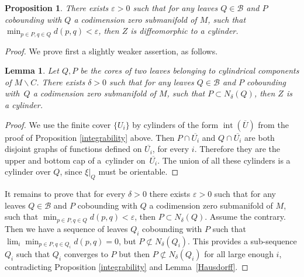\documentclass[JEP,XML,SOM,Unicode]{cedram}
\let\mathcal\mathscr
\let\moins\smallsetminus
\DeclareMathOperator{\inte}{int}
\newtheorem{lemma}[theorem]{Lemma}
\newtheorem{proposition}[theorem]{Proposition}
\theoremstyle{definition}
\theoremstyle{remark}
\numberwithin{equation}{section}
\begin{document}
\begin{proposition}\label{cylinderneighb}
There exists $\varepsilon\!>\!0$ such that for any leaves $Q\!\in\!\mathcal B$ and $P$ cobounding with $Q$ a codimension zero
submanifold of $M$, such that $\min_{p\in P, q\in Q} d(p,q) < \varepsilon$, then $Z$ is diffeomorphic to a cylinder.
\end{proposition}
\begin{proof}
We prove first a slightly weaker assertion, as follows.

\begin{lemma}
Let $Q,P$ be the cores of two leaves belonging to cylindrical components of $M\moins C$.
There exists $\delta>0$ such that for any leaves $Q\in \mathcal B$ and $P$ cobounding with~$Q$ a codimension zero
submanifold of $M$, such that $P\subset N_{\delta}(Q)$, then $Z$ is a cylinder.
\end{lemma}
\begin{proof}
We use the finite cover $\{U_i\}$ by cylinders of the form $\inte (\overline{U})$ from the proof of
Proposition \ref{integrability} above.
Then $P\cap \overline{U_i}$ and $Q\cap \overline{U_i}$ are both disjoint graphs of functions
defined on $\overline{U_i}$, for every $i$.
Therefore they are the upper and bottom cap of a~cylinder on~$\overline{U_i}$. The union of all these cylinders
is a cylinder over $Q$, since $\xi|_Q$ must be orientable.
\end{proof}

It remains to prove that for every $\delta>0$ there exists $\varepsilon>0$ such that for any leaves $Q\in \mathcal B$ and $P$ cobounding with $Q$ a codimension zero
submanifold of $M$, such that $\min_{p\in P, q\in Q} d(p,q) < \varepsilon$, then $P\subset N_{\delta}(Q)$.
Assume the contrary. Then we have a sequence of leaves $Q_i$ cobounding with $P$ such that
$\lim_i\min_{p\in P, q\in Q_i} d(p,q) =0$, but $P\not\subset N_{\delta}(Q_i)$. This provides a sub-sequence
$Q_i$ such that $Q_i$ converges to $P$ but then $P\not\subset N_{\delta}(Q_i)$ for all large enough $i$,
contradicting Proposition \ref{integrability} and Lemma~\ref{Hausdorff}.
\end{proof}
\end{document}
